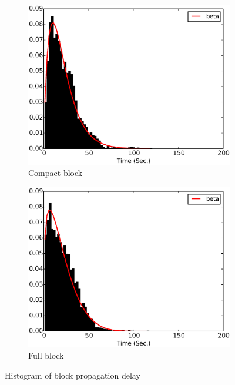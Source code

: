 \begin{figure}[!t]%
\begin{subfigure}{.48\linewidth}
\centering
\includegraphics[width=\linewidth]{image/cmpctblock_time_difference.eps}
\caption{Compact block}
\label{fig:cmpctblock_time_difference}
\end{subfigure}
\centering
\begin{subfigure}{.48\linewidth}
\includegraphics[width=\linewidth]{image/prop_delay_beta.eps}
\caption{Full block}
\label{fig:prop_delay}
\end{subfigure}
\caption{Histogram of block propagation delay}
\label{fig:prop_delay_full_compact}
\end{figure} 



